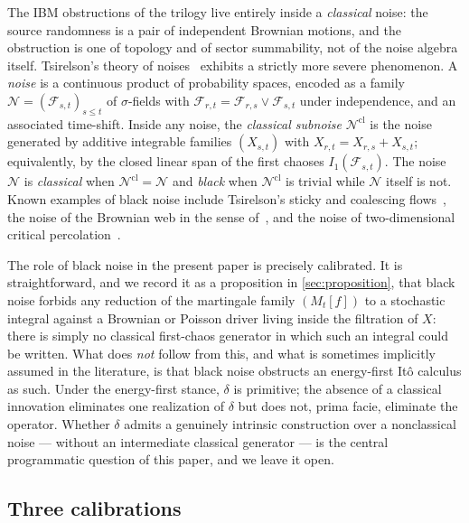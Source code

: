 \documentclass[11pt,reqno]{amsart}
\theoremstyle{plain}
\theoremstyle{definition}
\theoremstyle{remark}
\begin{document}
The IBM obstructions of the trilogy live entirely inside a
\emph{classical} noise: the source randomness is a pair of
independent Brownian motions, and the obstruction is one of
topology and of sector summability, not of the noise algebra itself.
Tsirelson's theory of noises~\cite{Tsirelson2004,TsirelsonVershik1998}
exhibits a strictly more severe phenomenon. A \emph{noise} is a
continuous product of probability spaces, encoded as a family
$\mathcal N=(\mathcal F_{s,t})_{s\le t}$ of $\sigma$-fields with
$\mathcal F_{r,t}=\mathcal F_{r,s}\vee\mathcal F_{s,t}$ under
independence, and an associated time-shift. Inside any noise, the
\emph{classical subnoise} $\mathcal N^{\mathrm{cl}}$ is the noise
generated by additive integrable families $(X_{s,t})$ with
$X_{r,t}=X_{r,s}+X_{s,t}$; equivalently, by the closed linear span of
the first chaoses $I_1(\mathcal F_{s,t})$. The noise $\mathcal N$ is
\emph{classical} when $\mathcal N^{\mathrm{cl}}=\mathcal N$ and
\emph{black} when $\mathcal N^{\mathrm{cl}}$ is trivial while
$\mathcal N$ itself is not. Known examples of black noise include
Tsirelson's sticky and coalescing flows~\cite{LeJanRaimond2004}, the
noise of the Brownian web in the sense of~\cite{Tsirelson2004,SSS2017},
and the noise of two-dimensional critical
percolation~\cite{SchrammSmirnov2011}.

The role of black noise in the present paper is precisely calibrated.
It is straightforward, and we record it as a proposition in
\cref{sec:proposition}, that black noise forbids any reduction of the
martingale family $(M_t[f])$ to a stochastic integral against a
Brownian or Poisson driver living inside the filtration of $X$: there
is simply no classical first-chaos generator in which such an
integral could be written. What does \emph{not} follow from this, and
what is sometimes implicitly assumed in the literature, is that black
noise obstructs an energy-first It\^o calculus as such. Under the
energy-first stance, $\delta$ is primitive; the absence of a
classical innovation eliminates one realization of $\delta$ but does
not, prima facie, eliminate the operator. Whether $\delta$ admits a
genuinely intrinsic construction over a nonclassical noise --- without
an intermediate classical generator --- is the central programmatic
question of this paper, and we leave it open.

\subsection{Three calibrations}\label{sec:intro-calibrations}
\end{document}
